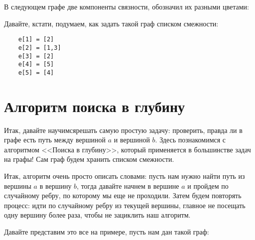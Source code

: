 \documentclass{article}
\begin{document}
В следующем графе две компоненты связности, обозначил их разными цветами: 

\begin{center}

\end{center}

Давайте, кстати, подумаем, как задать такой граф списком смежности: 

\begin{verbatim}
    e[1] = [2]
    e[2] = [1,3]
    e[3] = [2]
    e[4] = [5]
    e[5] = [4]
\end{verbatim}

\section{Алгоритм поиска в глубину}

Итак, давайте научимсярешать самую простую задачу: проверить, правда ли в графе есть путь между вершиной $a$ и вершиной $b$. Здесь познакомимся с алгоритмом <<Поиска в глубину>>, который применяется в большинстве задач на графы! Сам граф будем хранить списком смежности. 

Итак, алгоритм очень просто описать словами: пусть нам нужно найти путь из вершины $a$ в вершину $b$, тогда давайте начнем в вершине $a$ и пройдем по случайному ребру, по которому мы еще не проходили. Затем будем повторять процесс: идти по случайному ребру из текущей вершины, главное не посещать одну вершину более раза, чтобы не зациклить наш алгоритм.  

Давайте представим это все на примере, пусть нам дан такой граф:

\begin{center}

\end{center}
\end{document}
